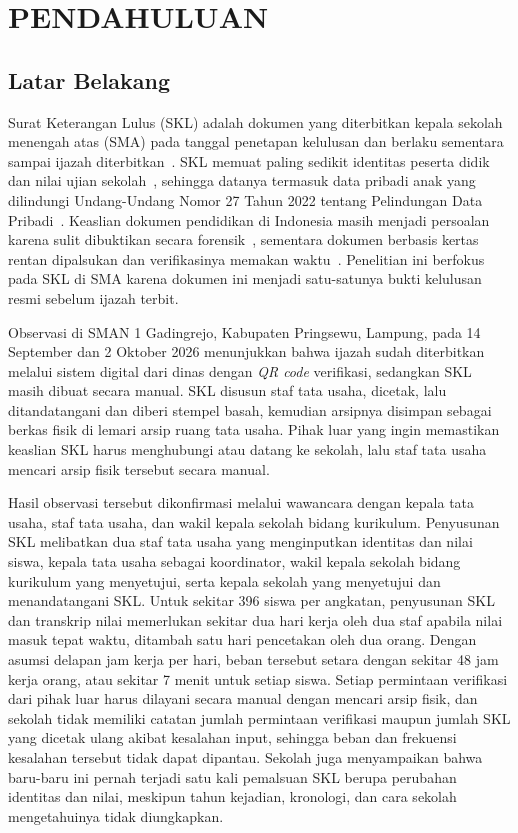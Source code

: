 \newpage
\chapter{PENDAHULUAN} \label{Bab I}
\providecommand{\isi}[1]{\textbf{[#1]}}


\section{Latar Belakang}
Surat Keterangan Lulus (SKL) adalah dokumen yang diterbitkan kepala sekolah menengah atas (SMA) pada tanggal penetapan kelulusan dan berlaku sementara sampai ijazah diterbitkan~\cite{Kepmendikdasmen2026SKL}. SKL memuat paling sedikit identitas peserta didik dan nilai ujian sekolah~\cite{Kepmendikdasmen2026SKL}, sehingga datanya termasuk data pribadi anak yang dilindungi Undang-Undang Nomor 27 Tahun 2022 tentang Pelindungan Data Pribadi~\cite{UU27Tahun2022}. Keaslian dokumen pendidikan di Indonesia masih menjadi persoalan karena sulit dibuktikan secara forensik~\cite{Zainuddin2025Ijazah}, sementara dokumen berbasis kertas rentan dipalsukan dan verifikasinya memakan waktu~\cite{Tariq2023Cerberus,AlHemairy2024UAE}. Penelitian ini berfokus pada SKL di SMA karena dokumen ini menjadi satu-satunya bukti kelulusan resmi sebelum ijazah terbit.

Observasi di SMAN 1 Gadingrejo, Kabupaten Pringsewu, Lampung, pada 14 September dan 2 Oktober 2026 menunjukkan bahwa ijazah sudah diterbitkan melalui sistem digital dari dinas dengan \textit{QR code} verifikasi, sedangkan SKL masih dibuat secara manual. SKL disusun staf tata usaha, dicetak, lalu ditandatangani dan diberi stempel basah, kemudian arsipnya disimpan sebagai berkas fisik di lemari arsip ruang tata usaha. Pihak luar yang ingin memastikan keaslian SKL harus menghubungi atau datang ke sekolah, lalu staf tata usaha mencari arsip fisik tersebut secara manual.

Hasil observasi tersebut dikonfirmasi melalui wawancara dengan kepala tata usaha, staf tata usaha, dan wakil kepala sekolah bidang kurikulum. Penyusunan SKL melibatkan dua staf tata usaha yang menginputkan identitas dan nilai siswa, kepala tata usaha sebagai koordinator, wakil kepala sekolah bidang kurikulum yang menyetujui, serta kepala sekolah yang menyetujui dan menandatangani SKL. Untuk sekitar 396 siswa per angkatan, penyusunan SKL dan transkrip nilai memerlukan sekitar dua hari kerja oleh dua staf apabila nilai masuk tepat waktu, ditambah satu hari pencetakan oleh dua orang. Dengan asumsi delapan jam kerja per hari, beban tersebut setara dengan sekitar 48 jam kerja orang, atau sekitar 7 menit untuk setiap siswa. Setiap permintaan verifikasi dari pihak luar harus dilayani secara manual dengan mencari arsip fisik, dan sekolah tidak memiliki catatan jumlah permintaan verifikasi maupun jumlah SKL yang dicetak ulang akibat kesalahan input, sehingga beban dan frekuensi kesalahan tersebut tidak dapat dipantau. Sekolah juga menyampaikan bahwa baru-baru ini pernah terjadi satu kali pemalsuan SKL berupa perubahan identitas dan nilai, meskipun tahun kejadian, kronologi, dan cara sekolah mengetahuinya tidak diungkapkan.

